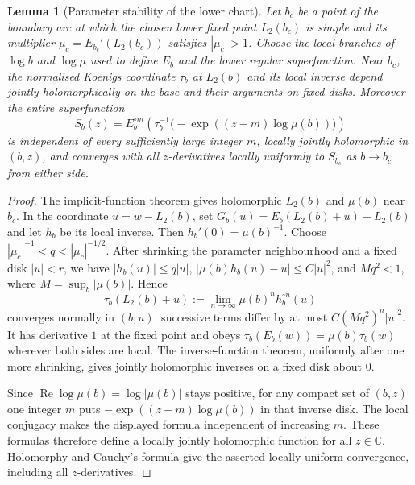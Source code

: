 \documentclass[11pt,a4paper]{article}
\newtheorem{lemma}[theorem]{Lemma}
\theoremstyle{definition}
\begin{document}
\begin{lemma}[Parameter stability of the lower chart]
\label{lem:lower-chart}
Let $b_c$ be a point of the boundary arc at which the chosen lower fixed
point $L_2(b_c)$ is simple and its multiplier
$\mu_c=E_{b_c}'(L_2(b_c))$ satisfies $|\mu_c|>1$.  Choose the local
branches of $\log b$ and $\log\mu$ used to define $E_b$ and the lower
regular superfunction.  Near $b_c$, the normalised Koenigs coordinate
$\tau_b$ at $L_2(b)$ and its local inverse depend jointly holomorphically
on the base and their arguments on fixed disks.  Moreover the entire
superfunction
\[
 S_b(z)=E_b^{\circ m}\!\left(\tau_b^{-1}
          \bigl(-\exp((z-m)\log\mu(b))\bigr)\right)
\]
is independent of every sufficiently large integer $m$, locally jointly
holomorphic in $(b,z)$, and converges with all $z$-derivatives locally
uniformly to $S_{b_c}$ as $b\to b_c$ from either side.
\end{lemma}

\begin{proof}
The implicit-function theorem gives holomorphic $L_2(b)$ and $\mu(b)$
near $b_c$.  In the coordinate $u=w-L_2(b)$, set
$G_b(u)=E_b(L_2(b)+u)-L_2(b)$ and let $h_b$ be its local inverse.
Then $h_b'(0)=\mu(b)^{-1}$.  Choose
$|\mu_c|^{-1}<q<|\mu_c|^{-1/2}$.  After shrinking the parameter
neighbourhood and a fixed disk $|u|<r$, we have
$|h_b(u)|\le q|u|$, $|\mu(b)h_b(u)-u|\le C|u|^2$, and
$M q^2<1$, where $M=\sup_b|\mu(b)|$.  Hence
\[
 \tau_b(L_2(b)+u):=\lim_{n\to\infty}\mu(b)^n h_b^{\circ n}(u)
\]
converges normally in $(b,u)$: successive terms differ by at most
$C(Mq^2)^n|u|^2$.  It has derivative $1$ at the fixed point and obeys
$\tau_b(E_b(w))=\mu(b)\tau_b(w)$ wherever both sides are local.
The inverse-function theorem, uniformly after one more shrinking, gives
jointly holomorphic inverses on a fixed disk about $0$.

Since $\operatorname{Re}\log\mu(b)=\log|\mu(b)|$ stays positive, for any
compact set of $(b,z)$ one integer $m$ puts
$-\exp((z-m)\log\mu(b))$ in that inverse disk.  The local conjugacy
makes the displayed formula independent of increasing $m$.  These
formulas therefore define a locally jointly holomorphic function for all
$z\in\mathbb C$.  Holomorphy and Cauchy's formula give the asserted
locally uniform convergence, including all $z$-derivatives.
\end{proof}
\end{document}
